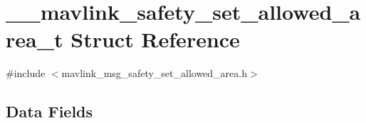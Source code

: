 \hypertarget{struct____mavlink__safety__set__allowed__area__t}{\section{\+\_\+\+\_\+mavlink\+\_\+safety\+\_\+set\+\_\+allowed\+\_\+area\+\_\+t Struct Reference}
\label{struct____mavlink__safety__set__allowed__area__t}
}


{\ttfamily \#include $<$mavlink\+\_\+msg\+\_\+safety\+\_\+set\+\_\+allowed\+\_\+area.\+h$>$}

\subsection*{Data Fields}
